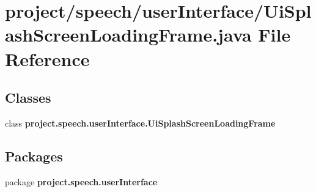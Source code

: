 \section{project/speech/user\+Interface/\+Ui\+Splash\+Screen\+Loading\+Frame.java File Reference}
\label{_ui_splash_screen_loading_frame_8java}
\subsection*{Classes}
\begin{DoxyCompactItemize}
\item 
class {\bf project.\+speech.\+user\+Interface.\+Ui\+Splash\+Screen\+Loading\+Frame}
\end{DoxyCompactItemize}
\subsection*{Packages}
\begin{DoxyCompactItemize}
\item 
package {\bf project.\+speech.\+user\+Interface}
\end{DoxyCompactItemize}

